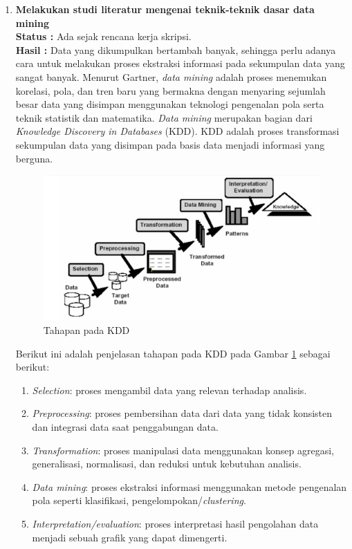 \documentclass[a4paper,twoside]{article}
\begin{document}
	\begin{enumerate}
		\item \textbf{Melakukan studi literatur mengenai teknik-teknik dasar data mining}\\
		{\bf Status :} Ada sejak rencana kerja skripsi.\\
		{\bf Hasil :} Data yang dikumpulkan bertambah banyak, sehingga perlu adanya cara untuk melakukan proses ekstraksi informasi pada sekumpulan data yang sangat banyak. Menurut Gartner, \textit{data mining} adalah proses menemukan korelasi, pola, dan tren baru yang bermakna dengan menyaring sejumlah besar data yang disimpan menggunakan teknologi pengenalan pola serta teknik statistik dan matematika. \textit{Data mining} merupakan bagian dari \textit{Knowledge Discovery in Databases} (KDD). KDD adalah proses transformasi sekumpulan data yang disimpan pada basis data menjadi informasi yang berguna.\\

\begin{figure}[H]
	\centering
	\includegraphics[scale=0.4]{datamining1}
	\caption{Tahapan pada KDD}
	\label{fig:datamining1}
\end{figure}

\noindent Berikut ini adalah penjelasan tahapan pada KDD pada Gambar \ref{fig:datamining1} sebagai berikut:

\begin{enumerate}
\item \textit{Selection}: proses mengambil data yang relevan terhadap analisis.
\item \textit{Preprocessing}: proses pembersihan data dari data yang tidak konsisten dan integrasi data saat penggabungan data.
\item \textit{Transformation}: proses manipulasi data menggunakan konsep agregasi, generalisasi, normalisasi, dan reduksi untuk kebutuhan analisis.
\item \textit{Data mining}: proses ekstraksi informasi menggunakan metode pengenalan pola seperti klasifikasi, pengelompokan/\textit{clustering}.
\item \textit{Interpretation/evaluation}: proses interpretasi hasil pengolahan data menjadi sebuah grafik yang dapat dimengerti.
\end{enumerate}



\end{enumerate}
\end{document}
